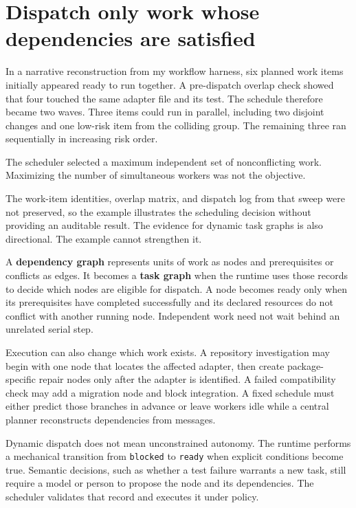 \section{Dispatch only work whose dependencies are satisfied}\label{dispatch-only-work-whose-dependencies-are-satisfied}

In a narrative reconstruction from my workflow harness, six planned work items initially appeared ready to run together. A pre-dispatch overlap check showed that four touched the same adapter file and its test. The schedule therefore became two waves. Three items could run in parallel, including two disjoint changes and one low-risk item from the colliding group. The remaining three ran sequentially in increasing risk order.

The scheduler selected a maximum independent set of nonconflicting work. Maximizing the number of simultaneous workers was not the objective.

The work-item identities, overlap matrix, and dispatch log from that sweep were not preserved, so the example illustrates the scheduling decision without providing an auditable result. The evidence for dynamic task graphs is also directional. The example cannot strengthen it.

A \textbf{dependency graph} represents units of work as nodes and prerequisites or conflicts as edges. It becomes a \textbf{task graph} when the runtime uses those records to decide which nodes are eligible for dispatch. A node becomes ready only when its prerequisites have completed successfully and its declared resources do not conflict with another running node. Independent work need not wait behind an unrelated serial step.

Execution can also change which work exists. A repository investigation may begin with one node that locates the affected adapter, then create package-specific repair nodes only after the adapter is identified. A failed compatibility check may add a migration node and block integration. A fixed schedule must either predict those branches in advance or leave workers idle while a central planner reconstructs dependencies from messages.

Dynamic dispatch does not mean unconstrained autonomy. The runtime performs a mechanical transition from \texttt{blocked} to \texttt{ready} when explicit conditions become true. Semantic decisions, such as whether a test failure warrants a new task, still require a model or person to propose the node and its dependencies. The scheduler validates that record and executes it under policy.

